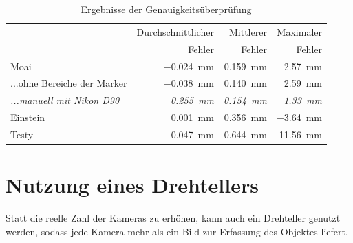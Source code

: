 \documentclass[./00PhotoBox.tex]{subfiles}
\begin{document}
\begin{table}[htbp]
    \centering
    \caption{Ergebnisse der Genauigkeitsüberprüfung}
    \label{tab:vergleich_erg}
    \begin{tabular}{l|r|r|r}
        \toprule
                                          & Durchschnittlicher                & Mittlerer                         & Maximaler                        \\
                                          & Fehler                            & Fehler                            & Fehler                           \\
        \midrule
        Moai                              & \SI{-0,024}{\milli\metre}         & \SI{0,159}{\milli\metre}          & \SI{2,57}{\milli\metre}          \\  %
        ...ohne Bereiche der Marker       & \SI{-0,038}{\milli\metre}         & \SI{0,140}{\milli\metre}          & \SI{2,59}{\milli\metre}          \\  %
        \textit{...manuell mit Nikon D90} & \textit{\SI{0,255}{\milli\metre}} & \textit{\SI{0,154}{\milli\metre}} & \textit{\SI{1,33}{\milli\metre}} \\
        \midrule
        Einstein                          & \SI{0,001}{\milli\metre}          & \SI{0,356}{\milli\metre}          & \SI{-3,64}{\milli\metre}         \\
        \midrule
        Testy                             & \SI{-0,047}{\milli\metre}         & \SI{0,644}{\milli\metre}          & \SI{11,56}{\milli\metre}         \\
        \bottomrule
    \end{tabular}
\end{table}


\section{Nutzung eines Drehtellers}
\label{s:drehteller}
Statt die reelle Zahl der Kameras zu erhöhen, kann auch ein Drehteller genutzt werden, sodass jede Kamera mehr als ein Bild zur Erfassung des Objektes liefert.
\end{document}
